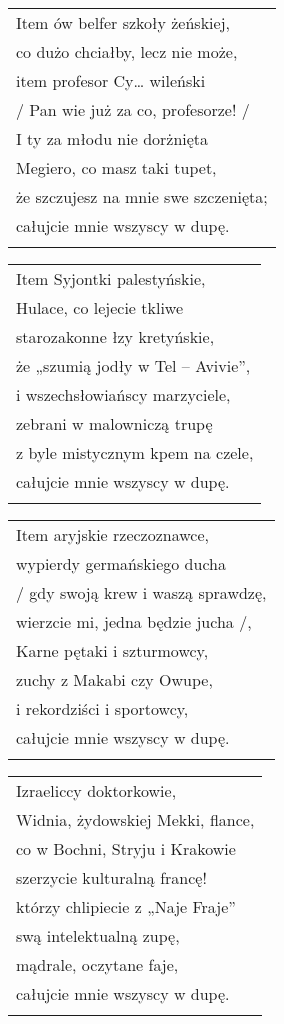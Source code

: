 \documentclass[a5paper]{article}
\begin{document}
\noindent
\begin{tabular}{@{}p{9.5cm}@{}}
Item ów belfer szkoły żeńskiej, \\
co dużo chciałby, lecz nie może, \\
item profesor Cy… wileński \\
/ Pan wie już za co, profesorze! / \\
I ty za młodu nie dorżnięta \\
Megiero, co masz taki tupet, \\
że szczujesz na mnie swe szczenięta; \\
całujcie mnie wszyscy w dupę. \\ \\
\end{tabular}

\noindent
\begin{tabular}{@{}p{9.5cm}@{}}
Item Syjontki palestyńskie, \\
Hulace, co lejecie tkliwe \\
starozakonne łzy kretyńskie, \\
że „szumią jodły w Tel – Avivie”, \\
i wszechsłowiańscy marzyciele, \\
zebrani w malowniczą trupę \\
z byle mistycznym kpem na czele, \\
całujcie mnie wszyscy w dupę. \\ \\
\end{tabular}

\noindent
\begin{tabular}{@{}p{9.5cm}@{}}
Item aryjskie rzeczoznawce, \\
wypierdy germańskiego ducha \\
/ gdy swoją krew i waszą sprawdzę, \\
wierzcie mi, jedna będzie jucha /, \\
Karne pętaki i szturmowcy, \\
zuchy z Makabi czy Owupe, \\
i rekordziści i sportowcy, \\
całujcie mnie wszyscy w dupę. \\ \\
\end{tabular}

\noindent
\begin{tabular}{@{}p{9.5cm}@{}}
Izraeliccy doktorkowie, \\
Widnia, żydowskiej Mekki, flance, \\
co w Bochni, Stryju i Krakowie \\
szerzycie kulturalną francę! \\
którzy chlipiecie z „Naje Fraje” \\
swą intelektualną zupę, \\
mądrale, oczytane faje, \\
całujcie mnie wszyscy w dupę. \\ \\
\end{tabular}
\end{document}
